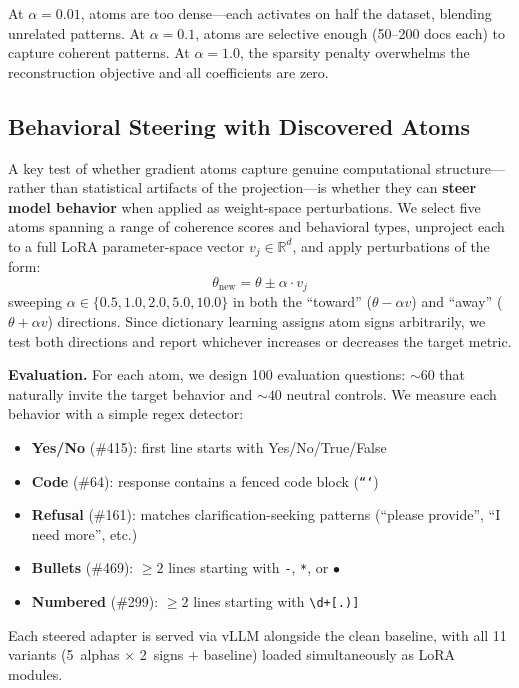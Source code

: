 \documentclass{article} %
\begin{document}
At $\alpha = 0.01$, atoms are too dense---each activates on half the dataset, blending unrelated patterns. At $\alpha = 0.1$, atoms are selective enough (50--200 docs each) to capture coherent patterns. At $\alpha = 1.0$, the sparsity penalty overwhelms the reconstruction objective and all coefficients are zero.


\subsection{Behavioral Steering with Discovered Atoms}
\label{sec:steering}

A key test of whether gradient atoms capture genuine computational structure---rather than statistical artifacts of the projection---is whether they can \textbf{steer model behavior} when applied as weight-space perturbations. We select five atoms spanning a range of coherence scores and behavioral types, unproject each to a full LoRA parameter-space vector $v_j \in \mathbb{R}^d$, and apply perturbations of the form:
\begin{equation}
\theta_{\text{new}} = \theta \pm \alpha \cdot v_j
\end{equation}
sweeping $\alpha \in \{0.5, 1.0, 2.0, 5.0, 10.0\}$ in both the ``toward'' ($\theta - \alpha v$) and ``away'' ($\theta + \alpha v$) directions. Since dictionary learning assigns atom signs arbitrarily, we test both directions and report whichever increases or decreases the target metric.

\textbf{Evaluation.} For each atom, we design 100 evaluation questions: ${\sim}60$ that naturally invite the target behavior and ${\sim}40$ neutral controls. We measure each behavior with a simple regex detector:
\begin{itemize}
\item \textbf{Yes/No} (\#415): first line starts with Yes/No/True/False
\item \textbf{Code} (\#64): response contains a fenced code block (\texttt{```})
\item \textbf{Refusal} (\#161): matches clarification-seeking patterns (``please provide'', ``I need more'', etc.)
\item \textbf{Bullets} (\#469): $\geq 2$ lines starting with \texttt{-}, \texttt{*}, or $\bullet$
\item \textbf{Numbered} (\#299): $\geq 2$ lines starting with \texttt{\textbackslash d+[.)]}
\end{itemize}

Each steered adapter is served via vLLM alongside the clean baseline, with all 11 variants (5~alphas $\times$ 2~signs + baseline) loaded simultaneously as LoRA modules.
\end{document}
